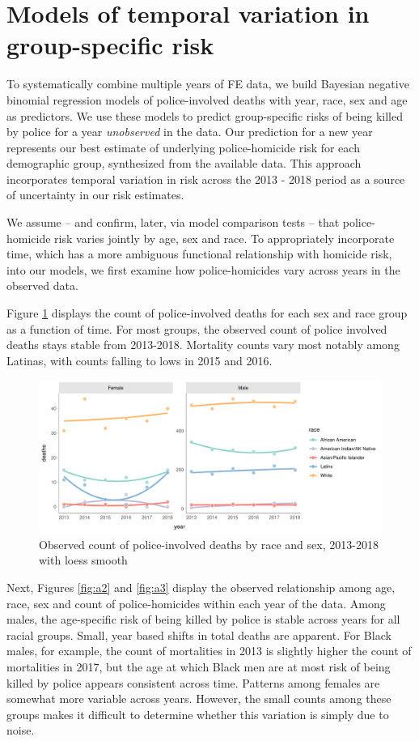 \documentclass{article}
\begin{document}
\section*{Models of temporal variation in group-specific risk}

To systematically combine multiple years of FE data, we build Bayesian negative binomial regression models of police-involved deaths with year, race, sex and age as predictors. We use these models to predict group-specific risks of being killed by police for a year \textit{unobserved} in the data. Our prediction for a new year represents our best estimate of underlying police-homicide risk for each demographic group, synthesized from the available data. This approach incorporates temporal variation in risk across the 2013 - 2018 period as a source of uncertainty in our risk estimates. 

We assume -- and confirm, later, via model comparison tests -- that police-homicide risk varies jointly by age, sex and race. To appropriately incorporate time, which has a more ambiguous functional relationship with homicide risk, into our models, we first examine how police-homicides vary across years in the observed data.  

Figure \ref{fig:a1} displays the count of police-involved deaths for each sex and race group as a function of time. For most groups, the observed count of police involved deaths stays stable from 2013-2018. Mortality counts vary most notably among Latinas, with counts falling to lows in 2015 and 2016.

\begin{figure}
\center
\includegraphics[width = \linewidth]{vis/fig_a1.pdf}
\caption{Observed count of police-involved deaths by race and sex, 2013-2018 with loess smooth}
\label{fig:a1}
\end{figure}

Next, Figures \ref{fig:a2} and \ref{fig:a3} display the observed relationship among age, race, sex and count of police-homicides within each year of the data. Among males, the age-specific risk of being killed by police is stable across years for all racial groups. Small, year based shifts in total deaths are apparent. For Black males, for example, the count of mortalities in 2013 is slightly higher the count of mortalities in 2017, but the age at which Black men are at most risk of being killed by police appears consistent across time. Patterns among females are somewhat more variable across years. However, the small counts among these groups makes it difficult to determine whether this variation is simply due to noise. 
\end{document}

